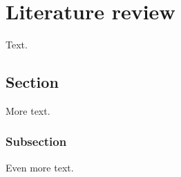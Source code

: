 \chapter{Literature review\label{cha:litreivew}}

Text.

\section{Section}

More text.

\subsection{Subsection}

Even more text.